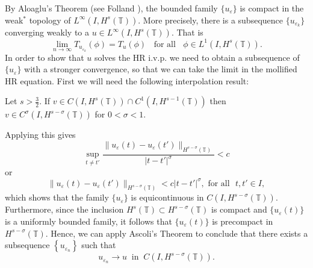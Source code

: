 \documentclass{beamer}
\newcommand{\ci}{\mathbb{T}}
\newcommand{\ee}{\varepsilon}
\begin{document}
\begin{frame}
	By Aloaglu's Theorem (see Folland \cite{Folland_1999_Real-analysis}), the bounded family $\{u_\ee\}$ is compact in the weak$^*$ topology of 
$L^\infty(I, H^s(\ci))$. More precisely,
there is a subsequence  $\{ u_{\ee_k} \}$ converging
weakly to a $ u\in L^{\infty}(I, H^s(\ci))$.
That is 
%
%
%
\begin{equation*}
\label{weak-conv}
\lim_{n\to \infty} T_{u_{\ee_k}}(\phi)  =  T_u (\phi) \; \;		\text{ for 
all } \;\;  \phi \in L^1(I, H^{s}(\ci)).
\end{equation*}
%
%
%
In order to show that $u$ solves the HR i.v.p. we need to obtain a 
subsequence of $\{u_{\ee}\}$ with a stronger convergence, so that we can take 
the limit in the mollified HR equation. First we will need the following 
interpolation result:

\end{frame}
%
%
%
%
\begin{frame}

\begin{lemma}[Interpolation]
\label{interpolation-lem}
Let  $s > \frac{3}{2}$.
If $v \in C(I, H^s(\ci)) \cap C^1(I, H^{s-1}(\ci))$
then $v \in C^\sigma (I, H^{s- \sigma}(\ci))$ for  $0 < \sigma < 1$.
\end{lemma}
%
Applying this gives 
%
%
%
\begin{equation*}
\label{equic-1}
\sup_{t \neq t'} \frac { \|u_\ee(t) - u_\ee(t') \|_{H^{s -
\sigma}(\ci)}}{|t - t'|^\sigma} < c 
\end{equation*}
%
%
%
or
%
%
%
\begin{equation*}
\label{equic-2}
\|u_\ee(t) - u_\ee(t') \|_{H^{s - \sigma}(\ci)}< c|t - t'|^\sigma, \text{ 
for all }  \,\,  t, t'\in I,
\end{equation*}
%
%
%
%
which shows that the family  $\{u_\ee\}$ is equicontinuous in $C(I, 
H^{s-\sigma}(\ci))$. Furthermore, since the inclusion $H^s(\ci) \subset H^{s-
\sigma }(\ci)$ is compact and 
$\{u_\ee(t)\}$ is a uniformly bounded family, it follows that
$\{u_\ee(t)\}$ is precompact in 
$H^{s-\sigma}(\ci)$. Hence, we can apply Ascoli's Theorem  
\cite{Dieudonne_1969_Foundations-of-} to conclude that there exists a 
subsequence $\left\{ u_{\ee_n} \right\}$
such that
%
%
\begin{equation*}
\label{strong-conv-of-u_ep}
u_{\ee_n} \to u \; \; \text{in} \; \; C(I, H^{s-\sigma}(\ci)).
\end{equation*}


\end{frame}
\end{document}
